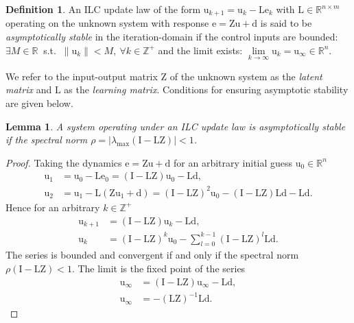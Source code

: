 \documentclass[10pt,a4paper]{article}
\theoremstyle{plain}
\newtheorem{lem}{Lemma}
\theoremstyle{definition}
\newtheorem{defn}{Definition}[section]
\newcommand{\boldvec}[1]{\boldsymbol{\mathrm{#1}}}
\let\vec\boldvec
\newcommand{\error}{\vec{e}} %
\newcommand{\linDist}{\vec{d}} %
\newcommand{\sysInput}{\vec{u}} %
\newcommand{\latentMat}{\vec{Z}} %
\newcommand{\lmatrix}{\vec{L}} %
\begin{document}
\begin{defn} An ILC update law of the form $\sysInput_{k+1} = \sysInput_{k} - \lmatrix \error_{k}$ with $\lmatrix \in \mathbb{R}^{n \times m}$ operating on the unknown system with response $\error = \latentMat \sysInput + \linDist$ is said to be \emph{asymptotically stable} in the iteration-domain if the control inputs are bounded: $\exists M \in \mathbb{R} \ $ s.t. $\ \|\sysInput_k\| < M, \ \forall k \in \mathbb{Z}^{+}$ and the limit exists: $\lim\limits_{k \to \infty}\sysInput_k = \sysInput_{\infty} \in \mathbb{R}^{n}$. \end{defn}
%
We refer to the input-output matrix $\latentMat$ of the unknown system as the \emph{latent matrix} and $\lmatrix$ as the \emph{learning matrix}. Conditions for ensuring asymptotic stability are given below.
%
\begin{lem} A system operating under an ILC update law is asymptotically stable if the spectral norm $\rho = |\lambda_{\mathrm{max}}(\vec{I} - \lmatrix\latentMat)| < 1$. \end{lem}
%
\begin{proof}
Taking the dynamics $\error = \latentMat \sysInput + \linDist$ for an arbitrary initial guess $\sysInput_0 \in \mathbb{R}^{n}$
\begin{align}
\sysInput_1 &= \sysInput_0 - \lmatrix\error_0 = (\vec{I} - \lmatrix\latentMat)\sysInput_0 - \lmatrix\linDist, \\
\sysInput_2 &= \sysInput_1 - \lmatrix(\latentMat\sysInput_1 + \linDist) = (\vec{I} - \lmatrix\latentMat)^{2}\sysInput_0 - (\vec{I} - \lmatrix\latentMat)\lmatrix\linDist - \lmatrix\linDist.
\end{align}
%
\noindent Hence for an arbitrary $k \in \mathbb{Z}^{+}$
%
\begin{align}
\sysInput_{k+1} &= (\vec{I} - \lmatrix\latentMat)\sysInput_{k} - \lmatrix\linDist, \\
\sysInput_k &= (\vec{I} - \lmatrix\latentMat)^{k}\sysInput_0 - \sum_{l=0}^{k-1}(\vec{I} - \lmatrix\latentMat)^{l}\lmatrix\linDist.
\end{align}
%
\noindent The series is bounded and convergent if and only if the spectral norm $\rho(\vec{I} - \lmatrix\latentMat) < 1$. The limit is the fixed point of the series
%
\begin{align}
\sysInput_{\infty} &= (\vec{I} - \lmatrix\latentMat)\sysInput_{\infty} - \lmatrix\linDist, \\
\sysInput_{\infty} &= -(\lmatrix\latentMat)^{-1}\lmatrix\linDist.
\end{align}
%
\end{proof}
\end{document}
